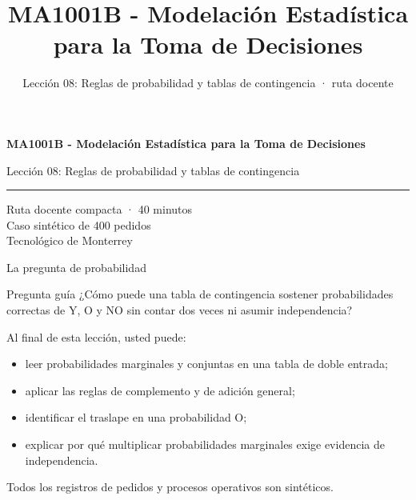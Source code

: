 \documentclass[aspectratio=169,10pt,spanish]{beamer}
\title{MA1001B - Modelación Estadística para la Toma de Decisiones}
\subtitle{Lección 08: Reglas de probabilidad y tablas de contingencia · ruta docente}
\author{}
\institute{Tecnol\'ogico de Monterrey}
\date{}
\begin{document}
\begin{frame}[plain]
  \vspace{1.2cm}
  {\Large\bfseries MA1001B - Modelación Estadística para la Toma de Decisiones\par}
  \vspace{0.7cm}
  {\large Lección 08: Reglas de probabilidad y tablas de contingencia\par}
  \vspace{0.7cm}
  {\color{TecRojo}\rule{\textwidth}{1.2pt}}
  \vspace{0.8cm}

  Ruta docente compacta · 40 minutos\\[0.3cm]
  Caso sintético de 400 pedidos\\[0.3cm]
  Tecnol\'ogico de Monterrey
\end{frame}

\begin{frame}{La pregunta de probabilidad}
  \begin{alertblock}{Pregunta guía}
    ¿Cómo puede una tabla de contingencia sostener probabilidades correctas de
    Y, O y NO sin contar dos veces ni asumir independencia?
  \end{alertblock}

  \vspace{0.4em}
  Al final de esta lección, usted puede:
  \begin{itemize}
    \item leer probabilidades marginales y conjuntas en una tabla de doble entrada;
    \item aplicar las reglas de complemento y de adición general;
    \item identificar el traslape en una probabilidad O;
    \item explicar por qué multiplicar probabilidades marginales exige evidencia
      de independencia.
  \end{itemize}

  \vfill
  \scriptsize Todos los registros de pedidos y procesos operativos son sintéticos.
\end{frame}
\end{document}
